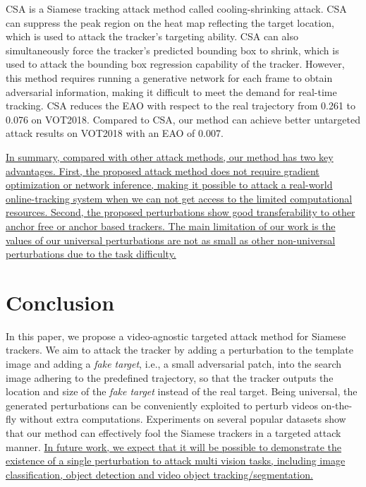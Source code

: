 \documentclass[journal]{IEEEtran}
\newcommand{\ie}{i.e.}
\begin{document}
CSA \cite{CSA} is a Siamese tracking attack method called cooling-shrinking attack. CSA can suppress the peak region on the heat map reflecting the target location, which is used to attack the tracker's targeting ability. CSA can also simultaneously force the tracker's predicted bounding box to shrink, which is used to attack the bounding box regression capability of the tracker. However, this method requires running a generative network for each frame to obtain adversarial information, making it difficult to meet the demand for real-time tracking. CSA reduces the EAO with respect to the real trajectory from 0.261 to 0.076 on VOT2018. Compared to CSA, our method can achieve better untargeted attack results on VOT2018 with an EAO of 0.007.

\uline{In summary, compared with other attack methods, our method has two key advantages. First, the proposed attack method does not require gradient optimization or network inference, making it possible to attack a real-world online-tracking system when we can not get access to the limited computational resources. Second, the proposed perturbations show good transferability to other anchor free or anchor based trackers. The main limitation of our work is the values of our universal perturbations are not as small as other non-universal perturbations due to the task difficulty.}

\section{Conclusion}

In this paper, we propose a video-agnostic targeted attack method for Siamese trackers. 
We aim to attack the tracker by adding a perturbation to the template image and adding a \textit{fake target}, \ie, a small adversarial patch, into the search image adhering to the predefined trajectory, so that the tracker outputs the location and size of the \textit{fake target} instead of the real target. Being universal, the generated perturbations can be conveniently exploited to perturb videos on-the-fly without extra computations.
Experiments on several popular datasets show that our method can effectively fool the Siamese trackers in a targeted attack manner.
\uline{In future work, we expect that it will be possible to demonstrate the existence of a single perturbation to attack multi vision tasks, including image classification, object detection and video object tracking/segmentation.}
\end{document}
